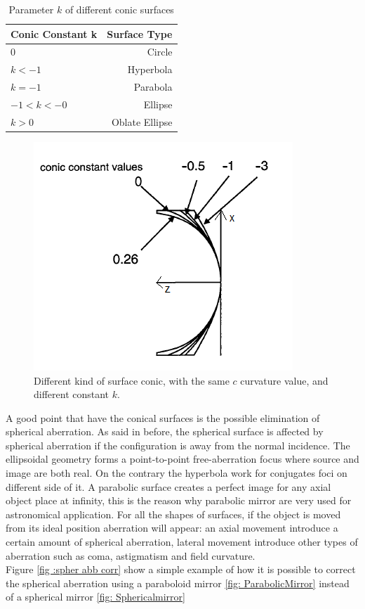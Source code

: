 \begin{table}[ht]
	\centering
		\begin{tabular}{l|r}
			Conic Constant k & Surface Type\\
			\hline
			0 & Circle \\
			$k < -1 $ & Hyperbola \\
			$k = -1 $ & Parabola \\
			$-1 < k < -0 $ & Ellipse \\
			$k > 0 $ & Oblate Ellipse \\	
		\end{tabular}
	\caption{Parameter $k$ of different conic surfaces}
	\label{tab: conic surface}
\end{table}
\begin{figure}[]
%
\centering
%
\includegraphics[width=.4\textwidth]{Immagini/Chapter2/SurfaceConic1}
%
\caption{Different kind of surface conic, with the same $c $ curvature value, and different constant $k $.}
%
\label{fig: SurfaceConic1}
%
\end{figure}
\noindent A good point that have the conical surfaces is the possible elimination of spherical aberration. As said in before, the spherical surface is affected by spherical aberration if the configuration is away from the normal incidence. The ellipsoidal geometry forms a point-to-point free-aberration focus where source and image are both real. On the contrary the hyperbola work for conjugates foci on different side of it. A parabolic surface creates a perfect image for any axial object place at infinity, this is the reason why parabolic mirror are very used for astronomical application. For all the shapes of surfaces, if the object is moved from its ideal position aberration will appear: an axial movement introduce a certain amount of spherical aberration, lateral movement introduce other types of aberration such as coma, astigmatism and field curvature.
\\
\noindent 
Figure \ref{fig :spher abb corr} show a simple example of how it is possible to correct the spherical aberration using a paraboloid mirror \ref{fig: ParabolicMirror} instead of a spherical mirror \ref{fig: Sphericalmirror}
